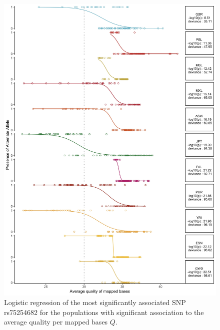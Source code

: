 \documentclass[9pt,lineno]{elife}
\begin{document}
\begin{figure}[h]
\includegraphics[width=\hsize,keepaspectratio]{./Figures/RegressionPlot_mostSig2.jpg}
\caption{Logistic regression of the most significantly associated SNP rs75254682 for the populations with significant association to the average quality per mapped bases $Q$.}
\label{MostSig}
\end{figure}
\end{document}

